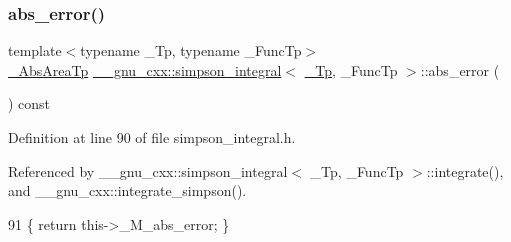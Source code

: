\subsubsection{\texorpdfstring{abs\+\_\+error()}{abs\_error()}}
{\footnotesize\ttfamily template$<$typename \+\_\+\+Tp, typename \+\_\+\+Func\+Tp$>$ \\
\hyperlink{class____gnu__cxx_1_1simpson__integral_a5c34021e2fac307bd282bf177db9e848}{\+\_\+\+Abs\+Area\+Tp} \hyperlink{class____gnu__cxx_1_1simpson__integral}{\+\_\+\+\_\+gnu\+\_\+cxx\+::simpson\+\_\+integral}$<$ \hyperlink{namespace____gnu__cxx_a3b19a9c800ca194374ef9172290f7d79}{\+\_\+\+Tp}, \+\_\+\+Func\+Tp $>$\+::abs\+\_\+error (\begin{DoxyParamCaption}{ }\end{DoxyParamCaption}) const\hspace{0.3cm}{\ttfamily [inline]}}



Definition at line 90 of file simpson\+\_\+integral.\+h.



Referenced by \+\_\+\+\_\+gnu\+\_\+cxx\+::simpson\+\_\+integral$<$ \+\_\+\+Tp, \+\_\+\+Func\+Tp $>$\+::integrate(), and \+\_\+\+\_\+gnu\+\_\+cxx\+::integrate\+\_\+simpson().


\begin{DoxyCode}
91       \{ \textcolor{keywordflow}{return} this->\_M\_abs\_error; \}
\end{DoxyCode}
\mbox{\label{class____gnu__cxx_1_1simpson__integral_a201a7dc0f406d2b1afe50d4b13a386ff}} 
